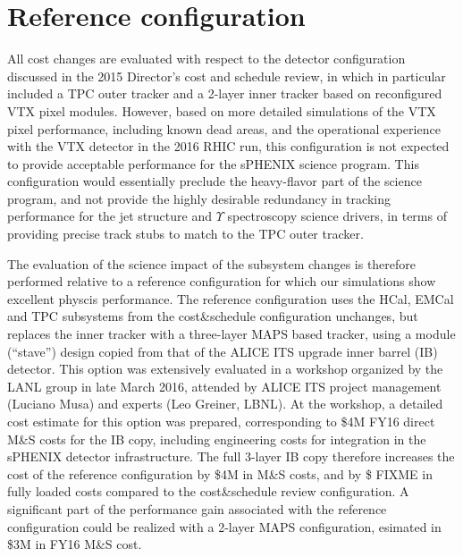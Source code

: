 \section{Reference configuration}

All cost changes are evaluated with respect to the detector configuration discussed in the 2015 Director's cost and schedule review, in 
which in particular included a TPC outer tracker and a 2-layer inner tracker based on reconfigured VTX pixel modules. However, based on
more detailed simulations of the VTX pixel performance, including known dead areas, and the operational experience with the VTX detector 
in the 2016 RHIC run, this configuration is not expected to provide acceptable performance for the sPHENIX science program. This configuration
would essentially preclude the heavy-flavor part of the science program, and not provide the highly desirable redundancy in tracking performance
for the jet structure and $\Upsilon$ spectroscopy science drivers, in terms of providing precise track stubs to match to the TPC outer tracker. 

The evaluation of the science impact of the subsystem changes is therefore performed relative to a reference configuration for 
which our simulations show excellent physcis performance. The reference configuration uses the HCal, EMCal and TPC subsystems 
from the cost\&schedule configuration unchanges, but replaces the inner tracker with a three-layer MAPS based tracker, using a module (``stave'')
design copied from that of the ALICE ITS upgrade inner barrel (IB) detector. This option was extensively evaluated in a workshop
organized by the LANL group in late March 2016, attended by ALICE ITS project management (Luciano Musa) and experts (Leo Greiner, LBNL). 
At the workshop, a detailed cost estimate for this option was prepared, corresponding to \$4M FY16 direct M\&S costs for the IB copy, 
including engineering costs for integration in the sPHENIX detector infrastructure. The full 3-layer IB copy therefore increases
the cost of the reference configuration by \$4M in M\&S costs, and by \$ FIXME in fully loaded costs compared to the cost\&schedule review
configuration. A significant part of the performance gain associated with the reference configuration could be realized with a 2-layer MAPS
configuration, esimated in \$3M in FY16 M\&S cost.

